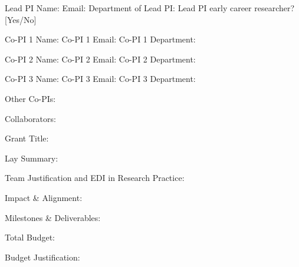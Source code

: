 Lead PI Name: 
Email:
Department of Lead PI:
Lead PI early career researcher? [Yes/No]

Co-PI 1 Name:
Co-PI 1 Email:
Co-PI 1 Department:

Co-PI 2 Name:
Co-PI 2 Email:
Co-PI 2 Department:

Co-PI 3 Name:
Co-PI 3 Email:
Co-PI 3 Department:

Other Co-PIs:


Collaborators:


Grant Title:

Lay Summary:


Team Justification and EDI in Research Practice: 




Impact & Alignment:



Milestones & Deliverables:



Total Budget:


Budget Justification: 





